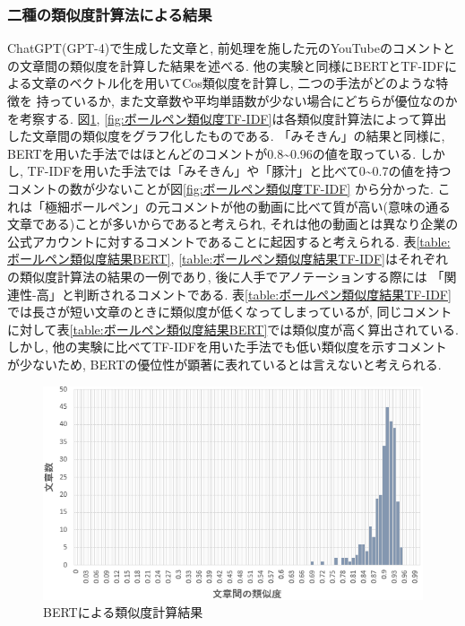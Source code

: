 \documentclass{ltjarticle}
\begin{document}
\subsubsection{二種の類似度計算法による結果}
ChatGPT(GPT-4)で生成した文章と, 前処理を施した元のYouTubeのコメントとの文章間の類似度を計算した結果を述べる. 
他の実験と同様にBERTとTF-IDFによる文章のベクトル化を用いてCos類似度を計算し, 二つの手法がどのような特徴を
持っているか, また文章数や平均単語数が少ない場合にどちらが優位なのかを考察する. 
図\ref{fig:ボールペン類似度BERT}, \ref{fig:ボールペン類似度TF-IDF}は各類似度計算法によって算出した文章間の類似度をグラフ化したものである. 
「みそきん」の結果と同様に, BERTを用いた手法ではほとんどのコメントが0.8\sim0.96の値を取っている. 
しかし, TF-IDFを用いた手法では「みそきん」や「豚汁」と比べて0\sim0.7の値を持つコメントの数が少ないことが図\ref{fig:ボールペン類似度TF-IDF}
から分かった. 
これは「極細ボールペン」の元コメントが他の動画に比べて質が高い(意味の通る文章である)ことが多いからであると考えられ, 
それは他の動画とは異なり企業の公式アカウントに対するコメントであることに起因すると考えられる. 
表\ref{table:ボールペン類似度結果BERT}, 
\ref{table:ボールペン類似度結果TF-IDF}はそれぞれの類似度計算法の結果の一例であり, 後に人手でアノテーションする際には
「関連性-高」と判断されるコメントである. 
表\ref{table:ボールペン類似度結果TF-IDF}では長さが短い文章のときに類似度が低くなってしまっているが, 
同じコメントに対して表\ref{table:ボールペン類似度結果BERT}では類似度が高く算出されている. 
しかし, 他の実験に比べてTF-IDFを用いた手法でも低い類似度を示すコメントが少ないため, 
BERTの優位性が顕著に表れているとは言えないと考えられる. 

\newpage
\begin{figure}[ht]
    \centering
    \includegraphics[width = 13.1cm]{images/ボールペンimages/BERT類似度.png}
    \caption{BERTによる類似度計算結果}
    \label{fig:ボールペン類似度BERT}
\end{figure}
\vspace{30truept}
\end{document}
